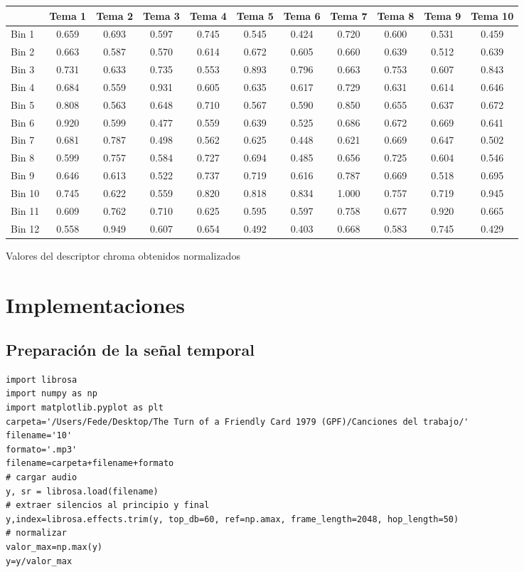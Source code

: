 \documentclass[]{article}
\makeatletter
\newcommand{\tabla}[4]{
\begin{tablehere}
\begin{center}
\begin{tabular}{#1}
#2
\end{tabular}
\caption{#3}
\label{#4}
\end{center}
\end{tablehere}
}
\newenvironment{tablehere}    %
  {\def\@captype{table}}    %

  {}              %
\makeatother
\begin{document}
\tabla
{|l|c|c|c|c|c|c|c|c|c|c|}
{
\hline
&Tema 1 & Tema 2 & Tema 3 & Tema 4 & Tema 5 & Tema 6 & Tema 7 & Tema 8 & Tema 9 & Tema 10 \\
\hline
Bin 1  & 0.659 & 0.693 & 0.597 & 0.745 & 0.545 & 0.424 & 0.720 & 0.600 & 0.531 & 0.459 \\
\hline
Bin 2  & 0.663 & 0.587 & 0.570 & 0.614 & 0.672 & 0.605 & 0.660 & 0.639 & 0.512 & 0.639 \\
\hline
Bin 3  & 0.731 & 0.633 & 0.735 & 0.553 & 0.893 & 0.796 & 0.663 & 0.753 & 0.607 & 0.843 \\
\hline
Bin 4  & 0.684 & 0.559 & 0.931 & 0.605 & 0.635 & 0.617 & 0.729 & 0.631 & 0.614 & 0.646 \\
\hline
Bin 5  & 0.808 & 0.563 & 0.648 & 0.710 & 0.567 & 0.590 & 0.850 & 0.655 & 0.637 & 0.672 \\
\hline
Bin 6  & 0.920 & 0.599 & 0.477 & 0.559 & 0.639 & 0.525 & 0.686 & 0.672 & 0.669 & 0.641 \\
\hline
Bin 7  & 0.681 & 0.787 & 0.498 & 0.562 & 0.625 & 0.448 & 0.621 & 0.669 & 0.647 & 0.502 \\
\hline
Bin 8  & 0.599 & 0.757 & 0.584 & 0.727 & 0.694 & 0.485 & 0.656 & 0.725 & 0.604 & 0.546 \\
\hline
Bin 9  & 0.646 & 0.613 & 0.522 & 0.737 & 0.719 & 0.616 & 0.787 & 0.669 & 0.518 & 0.695 \\
\hline
Bin 10 & 0.745 & 0.622 & 0.559 & 0.820 & 0.818 & 0.834 & 1.000 & 0.757 & 0.719 & 0.945 \\
\hline
Bin 11 & 0.609 & 0.762 & 0.710 & 0.625 & 0.595 & 0.597 & 0.758 & 0.677 & 0.920 & 0.665 \\
\hline
Bin 12 & 0.558 & 0.949 & 0.607 & 0.654 & 0.492 & 0.403 & 0.668 & 0.583 & 0.745 & 0.429 \\
\hline
}
{Valores del descriptor chroma obtenidos normalizados}
{tab: chroma}

\section{Implementaciones}
\subsection{Preparación de la señal temporal}
\label{Prep}
\begin{verbatim}
import librosa
import numpy as np
import matplotlib.pyplot as plt
carpeta='/Users/Fede/Desktop/The Turn of a Friendly Card 1979 (GPF)/Canciones del trabajo/'
filename='10'
formato='.mp3'
filename=carpeta+filename+formato
# cargar audio
y, sr = librosa.load(filename)
# extraer silencios al principio y final
y,index=librosa.effects.trim(y, top_db=60, ref=np.amax, frame_length=2048, hop_length=50)
# normalizar
valor_max=np.max(y)
y=y/valor_max
\end{verbatim}
\end{document}
